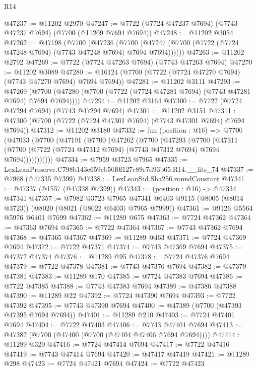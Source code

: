 \begin{lexlean}{R14}
\begin{coremodule}
@47237 := @11202 @2970
@47247 := @7722 (@7724 @47237 @7694) (@7743 @47237 @7694) (@7700 (@11209 @7694 @7694))
@47248 := @11202 @3054
@47262 := @47198
    (@7700
      (@47236
        (@7700 (@47247 (@7700 (@7722 (@7724 @47248 @7694) (@7743 @47248 @7694) @7694 @7694))))))
@47263 := @11202 @2792
@47269 := @7722 (@7724 @47263 @7694) (@7743 @47263 @7694)
@47270 := @11202 @3089
@47280 := @16124 (@7700 (@7722 (@7724 @47270 @7694) (@7743 @47270 @7694) @7694 @7694))
@47281 := @11202 @3111
@47293 := @47269
    (@7700 (@47280 (@7700 (@7722 (@7724 @47281 @7694) (@7743 @47281 @7694) @7694 @7694))))
@47294 := @11202 @3164
@47300 := @7722 (@7724 @47294 @7694) (@7743 @47294 @7694)
@47301 := @11202 @3151
@47311 := @47300 (@7700 (@7722 (@7724 @47301 @7694) (@7743 @47301 @7694) @7694 @7694))
@47312 := @11202 @3180
@47332 := fun (position : @16) =>
  @7700
    (@47033
      (@7700
        (@47191
          (@7700
            (@47262
              (@7700
                (@47293
                  (@7700
                    (@47311
                      (@7700 (@7722 (@7724 @47312 @7694) (@7743 @47312 @7694) @7694 @7694)))))))))))
@47334 := @7959 @3723 @7965
@47335 := LexLeanPreserve.C798b143e659cb50f0f127c89e7d93b65.R14.__fits_74
@47337 := @7968 (@47335 @7399)
@47338 := LexLeanStd.Sha256.roundConstant
@47341 := @47337 (@1557 (@47338 @7399))
@47343 := (position : @16) -> @47334 @47341
@47357 := @7982
    @3723
    @7965
    @47341
    @6403
    @9115
    (@8005 (@8014 @3723))
    (@8020 (@8021 (@8022 @6403) @7965 @7999))
@47361 := @9126 @5564 @5976 @6401 @7699
@47362 := @11289 @675
@47363 := @7724 @47362
@47364 := @47363 @7694
@47365 := @7722 @47364
@47367 := @7743 @47362 @7694
@47368 := @47365 @47367
@47369 := @11289 @463
@47371 := @7724 @47369 @7694
@47372 := @7722 @47371
@47374 := @7743 @47369 @7694
@47375 := @47372 @47374
@47376 := @11289 @95
@47378 := @7724 @47376 @7694
@47379 := @7722 @47378
@47381 := @7743 @47376 @7694
@47382 := @47379 @47381
@47383 := @11289 @170
@47385 := @7724 @47383 @7694
@47386 := @7722 @47385
@47388 := @7743 @47383 @7694
@47389 := @47386 @47388
@47390 := @11289 @22
@47392 := @7724 @47390 @7694
@47393 := @7722 @47392
@47395 := @7743 @47390 @7694
@47400 := @47389 (@7700 (@47393 @47395 @7694 @7694))
@47401 := @11289 @210
@47403 := @7724 @47401 @7694
@47404 := @7722 @47403
@47406 := @7743 @47401 @7694
@47413 := @47382 (@7700 (@47400 (@7700 (@47404 @47406 @7694 @7694))))
@47414 := @11289 @320
@47416 := @7724 @47414 @7694
@47417 := @7722 @47416
@47419 := @7743 @47414 @7694
@47420 := @47417 @47419
@47421 := @11289 @298
@47423 := @7724 @47421 @7694
@47424 := @7722 @47423

\end{coremodule}
\end{lexlean}
